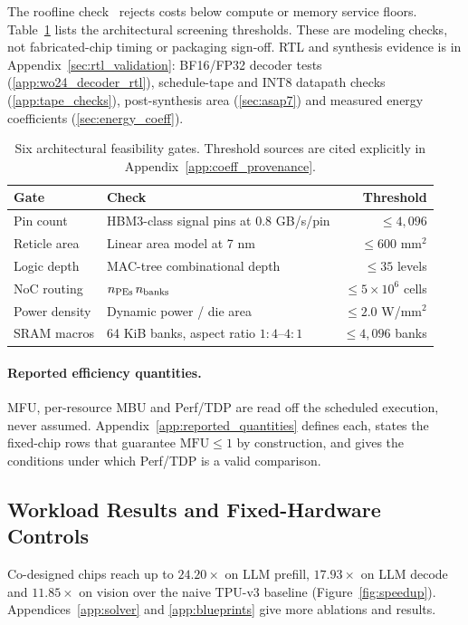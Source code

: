 The roofline check~\citep{williams2009roofline} rejects costs below compute or memory service floors.
Table~\ref{tab:mfg_gates} lists the architectural screening thresholds.
These are modeling checks, not fabricated-chip timing or packaging sign-off.
RTL and synthesis evidence is in Appendix~\ref{sec:rtl_validation}: BF16/FP32 decoder tests (\ref{app:wo24_decoder_rtl}), schedule-tape and INT8 datapath checks (\ref{app:tape_checks}), post-synthesis area (\ref{sec:asap7}) and measured energy coefficients (\ref{sec:energy_coeff}).

\begin{table}[t]
\centering\small
\caption{Six architectural feasibility gates. Threshold sources are cited explicitly in Appendix~\ref{app:coeff_provenance}.}
\label{tab:mfg_gates}
\begin{tabularx}{\linewidth}{@{}lXr@{}}
\toprule
Gate & Check & Threshold \\
\midrule
Pin count & HBM3-class signal pins at $0.8$ GB/s/pin & $\le4{,}096$ \\
Reticle area & Linear area model at 7 nm & $\le600$ mm$^2$ \\
Logic depth & MAC-tree combinational depth & $\le35$ levels \\
NoC routing & $n_{\rm PEs}\,n_{\rm banks}$ & $\le5\times10^6$ cells \\
Power density & Dynamic power / die area & $\le2.0$ W/mm$^2$ \\
SRAM macros & 64 KiB banks, aspect ratio $1{:}4$--$4{:}1$ & $\le4{,}096$ banks \\
\bottomrule
\end{tabularx}
\end{table}

\paragraph{Reported efficiency quantities.}
MFU, per-resource MBU and Perf/TDP are read off the scheduled execution, never assumed.
Appendix~\ref{app:reported_quantities} defines each, states the fixed-chip rows that guarantee $\mathrm{MFU}\le1$ by construction, and gives the conditions under which Perf/TDP is a valid comparison.

\subsection{Workload Results and Fixed-Hardware Controls}
\label{sec:prog}\label{sec:fixed_hw}

Co-designed chips reach up to $24.20\times$ on LLM prefill, $17.93\times$ on LLM decode and $11.85\times$ on vision over the naive TPU-v3 baseline (Figure~\ref{fig:speedup}).
Appendices~\ref{app:solver} and \ref{app:blueprints} give more ablations and results.


